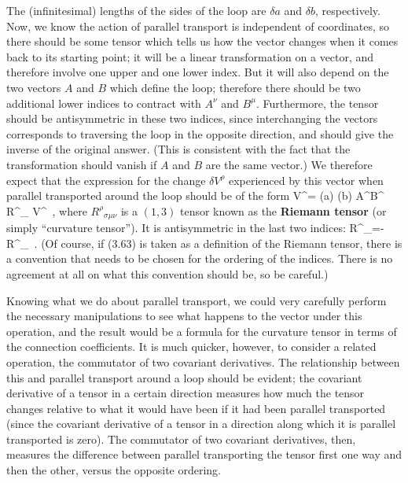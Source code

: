 \documentclass[12pt]{article}
\begin{document}
\noindent The (infinitesimal) lengths of the sides of the loop are $\delta 
a$ and $\delta b$, respectively.  Now, we know the action of parallel
transport is independent of coordinates, so there should be some
tensor which tells us how the vector changes when it comes back to 
its starting point; it will be a linear transformation on a vector,
and therefore involve one upper and one lower index.  But it will
also depend on the two vectors $A$ and $B$ which define the loop;
therefore there should be two additional lower indices to contract with
$A^\nu$ and $B^\mu$.  Furthermore, the tensor should be antisymmetric
in these two indices, since interchanging the vectors corresponds to
traversing the loop in the opposite direction, and should give the
inverse of the original answer.  (This is consistent with the
fact that the transformation should vanish if $A$ and $B$
are the same vector.)  We therefore expect that the expression for
the change $\delta V^\rho$ experienced by this vector when parallel
transported around the loop should be of the form
\be
  \delta V^\rho = (\delta a) (\delta b) A^\nu B^\mu
  R^\rho{}_{\sigma \mu\nu} V^\sigma\ ,\label{3.63}
\ee
where $R^\rho{}_{\sigma \mu\nu}$ is a $(1,3)$ tensor known as the
{\bf Riemann tensor} (or simply ``curvature tensor'').  It is
antisymmetric in the last two indices:
\be
  R^\rho{}_{\sigma \mu\nu}=-R^\rho{}_{\sigma \nu\mu}\ .\label{3.64}
\ee
(Of course, if (3.63) is taken as a definition of the Riemann tensor,
there is a convention that needs to be chosen for the ordering of
the indices.  There is no agreement at all on what this convention
should be, so be careful.)

Knowing what we do about parallel transport, we could very carefully
perform the necessary manipulations to see what happens to the
vector under this operation, and the result would be a formula for 
the curvature tensor in terms of the connection coefficients.  It is
much quicker, however, to consider a related operation, the 
commutator of two covariant derivatives.  The relationship between
this and parallel transport around a loop should be evident; the
covariant derivative of a tensor in a certain direction measures
how much the tensor changes relative to what it would have been if
it had been parallel transported (since the covariant derivative of
a tensor in a direction along which it is parallel transported is
zero).  The commutator of two covariant derivatives, then, measures
the difference between parallel transporting the tensor first one
way and then the other, versus the opposite ordering.
\end{document}
